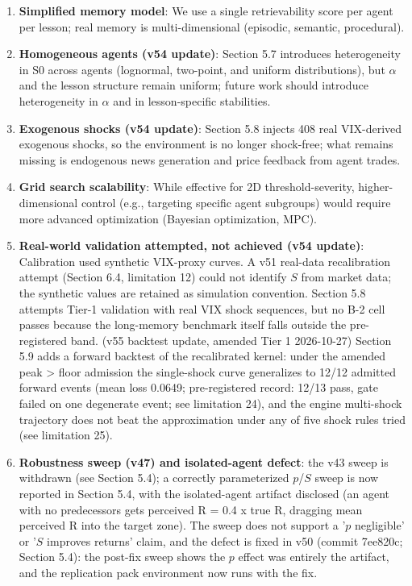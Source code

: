 \documentclass[11pt]{article}
\begin{document}
\begin{enumerate}
\item \textbf{Simplified memory model}: We use a single retrievability score per agent per lesson; real memory is multi-dimensional (episodic, semantic, procedural).
\item \textbf{Homogeneous agents (v54 update)}: Section 5.7 introduces heterogeneity in S0 across agents (lognormal, two-point, and uniform distributions), but $\alpha$ and the lesson structure remain uniform; future work should introduce heterogeneity in $\alpha$ and in lesson-specific stabilities.
\item \textbf{Exogenous shocks (v54 update)}: Section 5.8 injects 408 real VIX-derived exogenous shocks, so the environment is no longer shock-free; what remains missing is endogenous news generation and price feedback from agent trades.
\item \textbf{Grid search scalability}: While effective for 2D threshold-severity, higher-dimensional control (e.g., targeting specific agent subgroups) would require more advanced optimization (Bayesian optimization, MPC).
\item \textbf{Real-world validation attempted, not achieved (v54 update)}: Calibration used synthetic VIX-proxy curves. A v51 real-data recalibration attempt (Section 6.4, limitation 12) could not identify $S$ from market data; the synthetic values are retained as simulation convention. Section 5.8 attempts Tier-1 validation with real VIX shock sequences, but no B-2 cell passes because the long-memory benchmark itself falls outside the pre-registered band. (v55 backtest update, amended Tier 1 2026-10-27) Section 5.9 adds a forward backtest of the recalibrated kernel: under the amended peak > floor admission the single-shock curve generalizes to 12/12 admitted forward events (mean loss 0.0649; pre-registered record: 12/13 pass, gate failed on one degenerate event; see limitation 24), and the engine multi-shock trajectory does not beat the approximation under any of five shock rules tried (see limitation 25).
\item \textbf{Robustness sweep (v47) and isolated-agent defect}: the v43 sweep is withdrawn (see Section 5.4); a correctly parameterized $p$/$S$ sweep is now reported in Section 5.4, with the isolated-agent artifact disclosed (an agent with no predecessors gets perceived R = 0.4 x true R, dragging mean perceived R into the target zone). The sweep does not support a '$p$ negligible' or '$S$ improves returns' claim, and the defect is fixed in v50 (commit 7ee820c; Section 5.4): the post-fix sweep shows the $p$ effect was entirely the artifact, and the replication pack environment now runs with the fix.

\end{enumerate}
\end{document}
